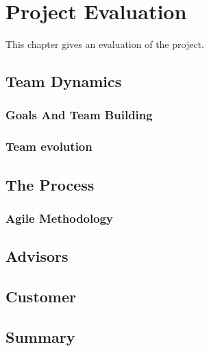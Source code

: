 \chapter{Project Evaluation}
This chapter gives an evaluation of the project.

\section{Team Dynamics}
\subsection{Goals And Team Building}

\subsection{Team evolution}

\section{The Process}
\subsection{Agile Methodology}

\subsection{}


\section{Advisors}

\section{Customer}

\section{Summary}

